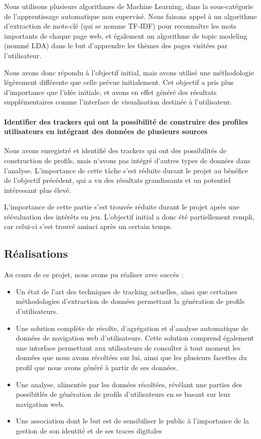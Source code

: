 		Nous utilisons plusieurs algorithmes de Machine Learning, dans la sous-catégorie de l'apprentissage automatique non supervisé. Nous faisons appel à un algorithme d'extraction de mots-clé (qui se nomme \gls{TF-IDF}) pour reconnaître les mots importants de chaque page web, et également un algorithme de topic modeling (nommé \gls{LDA}) dans le but d'apprendre les thèmes des pages visitées par l'utilisateur.
	
		Nous avons donc répondu à l'objectif initial, mais avons utilisé une méthodologie légèrement différente que celle prévue initialement. Cet objectif a pris plus d'importance que l'idée initiale, et avons en effet généré des résultats supplémentaires comme l'interface de visualisation destinée à l'utilisateur.

	\paragraph{Identifier des trackers qui ont la possibilité de construire des profiles utilisateurs en intégrant des données de plusieurs sources}

		Nous avons enregistré et identifié des trackers qui ont des possibilités de construction de profils, mais n'avons pas intégré d'autres types de données dans l'analyse. L'importance de cette tâche s'est réduite durant le projet au bénéfice de l'objectif précédent, qui a vu des résultats grandissants et un potentiel intéressant plus élevé.

		L'importance de cette partie s'est trouvée réduite durant le projet après une réévaluation des intérêts en jeu. L'objectif initial a donc été partiellement rempli, car celui-ci s'est trouvé aminci après un certain temps.

	\subsection{Réalisations}

		Au cours de ce projet, nous avons pu réaliser avec succès :
		\begin{itemize}
			\item Un état de l'art des techniques de tracking actuelles, ainsi que certaines méthodologies d'extraction de données permettant la génération de profils d'utilisateurs.
			\item Une solution complète de récolte, d'agrégation et d'analyse automatique de données de navigation web d'utilisateurs. Cette solution comprend également une interface permettant aux utilisateurs de consulter à tout moment les données que nous avons récoltées sur lui, ainsi que les plusieurs facettes du profil que nous avons généré à partir de ses données.
			\item Une analyse, alimentée par les données récoltées, révélant une parties des possibitlés de génération de profils d'utilisateurs en se basant sur leur navigation web.
			\item Une association dont le but est de sensibiliser le public à l'importance de la gestion de son identité et de ses traces digitales
		\end{itemize}

